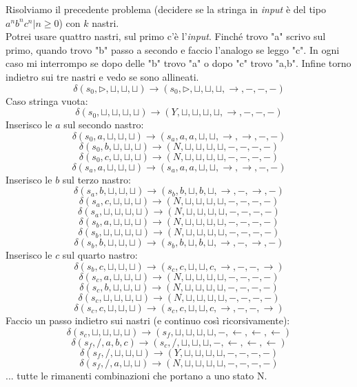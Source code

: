 \begin{esempio}
  Risolviamo il precedente problema (decidere se la stringa in \textit{input} è del tipo
  $a^nb^nc^n | n\geq0$) con $k$ nastri.\\
  Potrei usare quattro nastri, sul primo c'è l'\textit{input}. Finché trovo "a" scrivo sul
  primo, quando trovo "b" passo a secondo e faccio l'analogo se leggo "c". In
  ogni caso mi interrompo se dopo delle "b" trovo "a" o dopo "c" trovo
  "a,b". Infine torno indietro sui tre nastri e vedo se sono allineati.
    \[\delta(s_0,\triangleright, \sqcup, \sqcup, \sqcup)\to (s_0, \triangleright , \sqcup, \sqcup, \sqcup, \rightarrow, -, - ,-)\]
    Caso stringa vuota:
    \[\delta(s_0,\sqcup, \sqcup, \sqcup, \sqcup)\to (Y, \sqcup , \sqcup, \sqcup, \sqcup, \rightarrow, -, -, -)\]
    Inserisco le $a$ sul secondo nastro:
    \[\delta(s_0, a, \sqcup, \sqcup, \sqcup)\to (s_a, a , a, \sqcup, \sqcup, \rightarrow, \rightarrow, -, -)\]
    \[\delta(s_0, b, \sqcup, \sqcup, \sqcup)\to (N, \sqcup, \sqcup, \sqcup, \sqcup, -, -, -, -)\]
    \[\delta(s_0, c, \sqcup, \sqcup, \sqcup)\to (N, \sqcup, \sqcup, \sqcup, \sqcup, -, -, -, -)\]
    \[\delta(s_a, a, \sqcup, \sqcup, \sqcup)\to (s_a, a, a, \sqcup, \sqcup, \rightarrow, \rightarrow, -, -)\]
    Inserisco le $b$ sul terzo nastro:
    \[\delta(s_a, b, \sqcup, \sqcup, \sqcup)\to (s_b, b, \sqcup, b, \sqcup, \rightarrow,  -, \rightarrow, -)\]
    \[\delta(s_a, c, \sqcup, \sqcup, \sqcup)\to (N, \sqcup, \sqcup, \sqcup, \sqcup, -, -, -, -)\]
    \[\delta(s_a, \sqcup, \sqcup, \sqcup, \sqcup)\to (N, \sqcup, \sqcup, \sqcup, \sqcup, -, -, -, -)\]
    \[\delta(s_b, a, \sqcup, \sqcup, \sqcup)\to (N, \sqcup, \sqcup, \sqcup, \sqcup, -, -, -, -)\]
    \[\delta(s_b, \sqcup, \sqcup, \sqcup, \sqcup)\to (N, \sqcup, \sqcup, \sqcup, \sqcup, -, -, -, -)\]
    \[\delta(s_b, b, \sqcup, \sqcup, \sqcup)\to (s_b, b, \sqcup, b, \sqcup, \rightarrow, -, \rightarrow, -)\]
    Inserisco le $c$ sul quarto nastro:
    \[\delta(s_b, c, \sqcup, \sqcup, \sqcup)\to (s_c, c, \sqcup, \sqcup, c, \rightarrow, -, -, \rightarrow)\]
    \[\delta(s_c, a, \sqcup, \sqcup, \sqcup)\to (N, \sqcup, \sqcup, \sqcup, \sqcup, -, -, -, -)\]
    \[\delta(s_c, b, \sqcup, \sqcup, \sqcup)\to (N, \sqcup, \sqcup, \sqcup, \sqcup, -, -, -, -)\]
    \[\delta(s_c, \sqcup, \sqcup, \sqcup, \sqcup)\to (N, \sqcup, \sqcup, \sqcup, \sqcup, -, -, -, -)\]
    \[\delta(s_c, c, \sqcup, \sqcup, \sqcup)\to (s_c, c, \sqcup, \sqcup, c, \rightarrow, -, -, \rightarrow)\]
    Faccio un passo indietro sui nastri (e continuo così ricorsivamente):
    \[\delta(s_c, \sqcup, \sqcup, \sqcup, \sqcup)\to (s_f, \sqcup, \sqcup, \sqcup, \sqcup, -, \leftarrow, \leftarrow, \leftarrow)\]
    \[\delta(s_f, /, a, b, c)\to (s_c, /, \sqcup, \sqcup, \sqcup, -, \leftarrow, \leftarrow, \leftarrow)\]
    \[\delta(s_f, /, \sqcup, \sqcup, \sqcup)\to (Y, \sqcup, \sqcup, \sqcup, \sqcup, -, -, -, -)\]
    \[\delta(s_f, /, a, \sqcup, \sqcup)\to (N, \sqcup, \sqcup, \sqcup, \sqcup, -, -, -, -)\]
    ... tutte le rimanenti combinazioni che portano a uno stato N.
\end{esempio}
